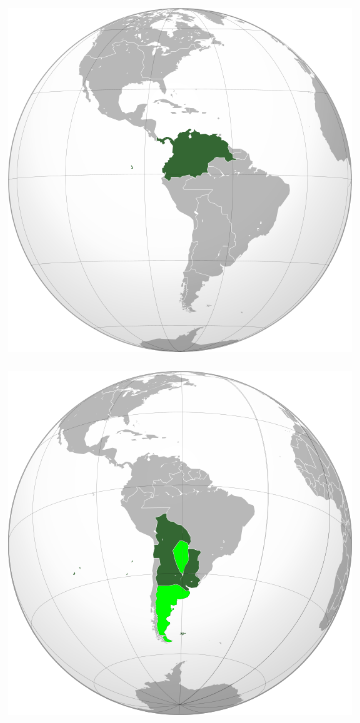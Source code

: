 \documentclass[10pt]{article}
\begin{document}
\begin{enumerate}
\begin{figure}[ht]
\begin{subfigure}{0.15\textwidth}
\caption{\label{fig:1b}}
\end{subfigure}
\begin{subfigure}{0.15\textwidth}
\includegraphics[width=\textwidth]{vice_nuevagranada.png}
\caption{\label{fig:1c}}
\end{subfigure}
\begin{subfigure}{0.15\textwidth}
\includegraphics[width=\textwidth]{vice_riodelaplata.png}

\end{subfigure}
\end{figure}
\end{enumerate}
\end{document}
